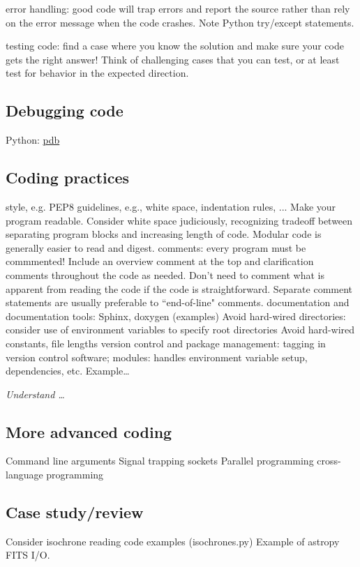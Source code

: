 \documentclass{article}
\newcommand{\test}[1]{%
    \begin{center}
        \colorbox{hl}{\parbox{0.9\textwidth}{\emph{\centering #1}}}
    \end{center}}
\begin{document}
error handling: good code will trap errors and report the source
rather than rely on the error message when the code crashes. Note
Python try/except statements.

testing code: find a case where you know the solution and make sure
your code gets the right answer! Think of challenging cases that you
can test, or at least test for behavior in the expected direction.

\subsection{Debugging code}
Python: \href{https://docs.python.org/2/library/pdb.html}{pdb}

\subsection{Coding practices}
style, e.g. PEP8 guidelines, e.g., white space, indentation rules, ...
Make your program readable. Consider white space judiciously,
recognizing tradeoff between separating program blocks and increasing
length of code. Modular code is generally easier to read and digest.
comments: every program must be commmented! Include an overview
comment at the top and clarification comments throughout the code as
needed. Don't need to comment what is apparent from reading the code
if the code is straightforward. Separate comment statements are
usually preferable to ``end-of-line" comments.
documentation and documentation tools: Sphinx, doxygen (examples)
Avoid hard-wired directories: consider use of environment variables to
specify root directories
Avoid hard-wired constants, file lengths
version control and package management: tagging in version control
software; modules: handles environment variable setup, dependencies,
etc. Example\ldots

\test{Understand \ldots}

\subsection{More advanced coding}
Command line arguments
Signal trapping
sockets
Parallel programming
cross-language programming

\subsection{Case study/review}
Consider isochrone reading code examples (isochrones.py)
Example of astropy FITS I/O.
\end{document}
